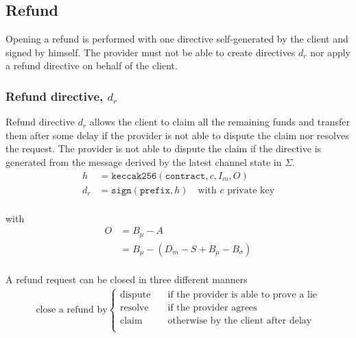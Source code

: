\documentclass{llncs}
\begin{document}
\subsection{Refund} Opening a refund is performed with one directive self-generated by the client and signed by himself. The provider must not be able to create directives $d_r$ nor apply a refund directive on behalf of the client.

\subsubsection{Refund directive, $d_r$} Refund directive $d_r$ allows the client to claim all the remaining funds and transfer them after some delay if the provider is not able to dispute the claim nor resolves the request. The provider is not able to dispute the claim if the directive is generated from the message derived by the latest channel state in $\Sigma$.
\begin{equation*}
\begin{split}
    h &= \texttt{keccak256}(\texttt{contract},c,I_m,O) \\
    d_r &= \texttt{sign}(\texttt{prefix}, h) \quad \text{with $c$ private key} \\
\end{split}
\end{equation*}

with
\begin{equation*}
\begin{split}
    O &= B_\mu - A \\
    &= B_\mu - (D_m - S + B_\mu - B_\sigma) \\
\end{split}
\end{equation*}

A refund request can be closed in three different manners
\begin{equation*}
\begin{split}
    \text{close a refund by}
  \begin{cases}
      \text{dispute} & \quad \text{if the provider is able to prove a lie} \\
      \text{resolve} & \quad \text{if the provider agrees} \\
      \text{claim} & \quad \text{otherwise by the client after delay} \\
  \end{cases}
\end{split}
\end{equation*}
\end{document}
